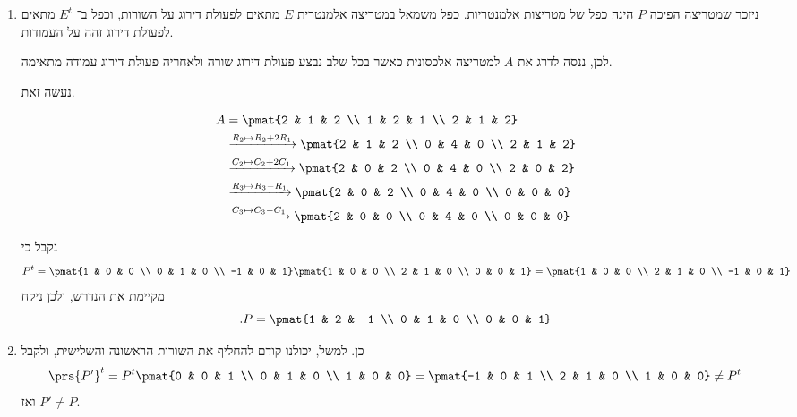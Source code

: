 \documentclass[a4paper,10pt,twoside,openany]{book}
\begin{document}
\begin{solution}
\begin{enumerate}
    \item 
ניזכר שמטריצה הפיכה
$P$
הינה כפל של מטריצות אלמנטריות. כפל משמאל במטריצה אלמנטרית
$E$
מתאים לפעולת דירוג על השורות, וכפל ב־%
$E^t$
מתאים לפעולת דירוג זהה על העמודות.

לכן, ננסה לדרג את
$A$
למטריצה אלכסונית כאשר בכל שלב נבצע פעולת דירוג שורה ולאחריה פעולת דירוג עמודה מתאימה.

נעשה זאת.

\begin{align*}
    A &= \pmat{2 & 1 & 2 \\ 1 & 2 & 1 \\ 2 & 1 & 2}
    \\&\xrightarrow{R_2 \mapsto R_2 + 2 R_1}
    \pmat{2 & 1 & 2 \\ 0 & 4 & 0 \\ 2 & 1 & 2}
    \\&\xrightarrow{C_2 \mapsto C_2 + 2 C_1}
    \pmat{2 & 0 & 2 \\ 0 & 4 & 0 \\ 2 & 0 & 2}
    \\&\xrightarrow{R_3 \mapsto R_3 - R_1}
    \pmat{2 & 0 & 2 \\ 0 & 4 & 0 \\ 0 & 0 & 0}
    \\&\xrightarrow{C_3 \mapsto C_3 - C_1}
    \pmat{2 & 0 & 0 \\ 0 & 4 & 0 \\ 0 & 0 & 0}
\end{align*}

נקבל כי
\[P^t = \pmat{1 & 0 & 0 \\ 0 & 1 & 0 \\ -1 & 0 & 1} \pmat{1 & 0 & 0 \\ 2 & 1 & 0 \\ 0 & 0 & 1} = \pmat{1 & 0 & 0 \\ 2 & 1 & 0 \\ -1 & 0 & 1}\]
מקיימת את הנדרש, ולכן ניקח
\[\text{.} P = \pmat{1 & 2 & -1 \\ 0 & 1 & 0 \\ 0 & 0 & 1}\]

\item כן. למשל, יכולנו קודם להחליף את השורות הראשונה והשלישית, ולקבל
\[\prs{P'}^t = P^t \pmat{0 & 0 & 1 \\ 0 & 1 & 0 \\ 1 & 0 & 0} = \pmat{-1 & 0 & 1 \\ 2 & 1 & 0 \\ 1 & 0 & 0} \neq P^t\]
ואז
$P' \neq P$.


\end{enumerate}
\end{solution}
\end{document}
